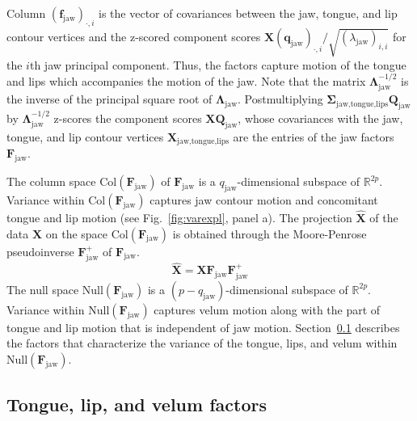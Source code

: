\documentclass[preprint]{JASAnew}\usepackage[]{graphicx}\usepackage[]{color}
\begin{document}
%
Column $(\mathbf{f}_\text{jaw})_{\cdot,i}$ is the vector of covariances between the jaw, tongue, and lip contour vertices and the z-scored component scores $\mathbf{X} (\mathbf{q}_\text{jaw})_{\cdot,i} / \sqrt{(\lambda_\text{jaw})_{i,i}}$ for the $i$th jaw principal component. 
%
Thus, the factors capture motion of the tongue and lips which accompanies the motion of the jaw. 
%
Note that the matrix $\boldsymbol{\Lambda}_\text{jaw}^{-1/2}$ is the inverse of the principal square root of $\boldsymbol{\Lambda}_\text{jaw}$.
%
Postmultiplying $\boldsymbol{\Sigma}_\text{jaw,tongue,lips} \mathbf{Q}_\text{jaw}$ by $\boldsymbol{\Lambda}_\text{jaw}^{-1/2}$ z-scores the component scores $\mathbf{X}\mathbf{Q}_\text{jaw}$, whose covariances with the jaw, tongue, and lip contour vertices $\mathbf{X}_\text{jaw,tongue,lips}$ are the entries of the jaw factors $\mathbf{F}_\text{jaw}$.

The column space $\mathrm{Col}(\mathbf{F}_\text{jaw})$ of $\mathbf{F}_\text{jaw}$ is a $q_\text{jaw}$-dimensional subspace of $\mathbb{R}^{2p}$. 
%
Variance within $\mathrm{Col}(\mathbf{F}_\text{jaw})$ captures jaw contour motion and concomitant tongue and lip motion (see Fig.~\ref{fig:varexpl}, panel a).
%
The projection $\mathbf{\hat{X}}$ of the data $\mathbf{X}$ on the space $\mathrm{Col}(\mathbf{F}_\text{jaw})$ is obtained through the Moore-Penrose pseudoinverse $\mathbf{F}_\text{jaw}^+$ of $\mathbf{F}_\text{jaw}$. 
%
\begin{equation} \label{eq:XXuu}
\mathbf{\hat{X}} 
= \mathbf{X} 
  \mathbf{F}_\text{jaw}
  \mathbf{F}_\text{jaw}^+ 
\end{equation}
%
The null space $\mathrm{Null}(\mathbf{F}_\text{jaw})$ is a $(p-q_\text{jaw})$-dimensional subspace of $\mathbb{R}^{2p}$. 
% 
Variance within $\mathrm{Null}(\mathbf{F}_\text{jaw})$ captures velum motion along with the part of tongue and lip motion that is independent of jaw motion. 
%
Section~\ref{subsec:residfactors} describes the factors that characterize the variance of the tongue, lips, and velum within $\mathrm{Null} \left( \mathbf{F}_\text{jaw} \right)$. 





\subsection{Tongue, lip, and velum factors}
\label{subsec:residfactors}
\end{document}
